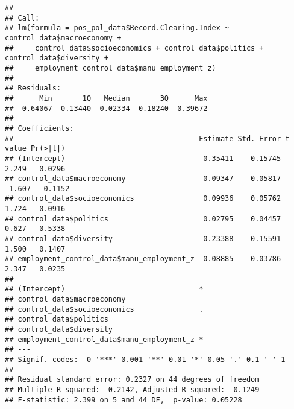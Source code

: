 \documentclass[
]{article}
\newenvironment{Shaded}{\begin{snugshade}}{\end{snugshade}}
\newcommand{\CommentTok}[1]{\textcolor[rgb]{0.56,0.35,0.01}{\textit{#1}}}
\newcommand{\FunctionTok}[1]{\textcolor[rgb]{0.13,0.29,0.53}{\textbf{#1}}}
\newcommand{\NormalTok}[1]{#1}
\newcommand{\OtherTok}[1]{\textcolor[rgb]{0.56,0.35,0.01}{#1}}
\newcommand{\SpecialCharTok}[1]{\textcolor[rgb]{0.81,0.36,0.00}{\textbf{#1}}}
\begin{document}
\begin{Shaded}
\end{Shaded}

\begin{verbatim}
## 
## Call:
## lm(formula = pos_pol_data$Record.Clearing.Index ~ control_data$macroeconomy + 
##     control_data$socioeconomics + control_data$politics + control_data$diversity + 
##     employment_control_data$manu_employment_z)
## 
## Residuals:
##      Min       1Q   Median       3Q      Max 
## -0.64067 -0.13440  0.02334  0.18240  0.39672 
## 
## Coefficients:
##                                           Estimate Std. Error t value Pr(>|t|)
## (Intercept)                                0.35411    0.15745   2.249   0.0296
## control_data$macroeconomy                 -0.09347    0.05817  -1.607   0.1152
## control_data$socioeconomics                0.09936    0.05762   1.724   0.0916
## control_data$politics                      0.02795    0.04457   0.627   0.5338
## control_data$diversity                     0.23388    0.15591   1.500   0.1407
## employment_control_data$manu_employment_z  0.08885    0.03786   2.347   0.0235
##                                            
## (Intercept)                               *
## control_data$macroeconomy                  
## control_data$socioeconomics               .
## control_data$politics                      
## control_data$diversity                     
## employment_control_data$manu_employment_z *
## ---
## Signif. codes:  0 '***' 0.001 '**' 0.01 '*' 0.05 '.' 0.1 ' ' 1
## 
## Residual standard error: 0.2327 on 44 degrees of freedom
## Multiple R-squared:  0.2142, Adjusted R-squared:  0.1249 
## F-statistic: 2.399 on 5 and 44 DF,  p-value: 0.05228
\end{verbatim}
\end{document}
